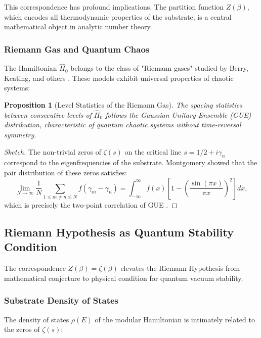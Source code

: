 \documentclass[11pt, a4paper]{article}
\theoremstyle{plain}
\newtheorem{proposition}[theorem]{Proposition}
\theoremstyle{definition}
\begin{document}
This correspondence has profound implications. The partition function $Z(\beta)$, which encodes all thermodynamic properties of the substrate, is a central mathematical object in analytic number theory.

\subsubsection{Riemann Gas and Quantum Chaos}

The Hamiltonian $\hat{H}_0$ belongs to the class of "Riemann gases" studied by Berry, Keating, and others \cite{Berry1999}. These models exhibit universal properties of chaotic systems:

\begin{proposition}[Level Statistics of the Riemann Gas]
The spacing statistics between consecutive levels of $\hat{H}_0$ follows the Gaussian Unitary Ensemble (GUE) distribution, characteristic of quantum chaotic systems without time-reversal symmetry.
\end{proposition}

\begin{proof}[Sketch]
The non-trivial zeros of $\zeta(s)$ on the critical line $s = 1/2 + i\gamma_n$ correspond to the eigenfrequencies of the substrate. Montgomery showed that the pair distribution of these zeros satisfies:
\begin{equation}
\lim_{N \to \infty} \frac{1}{N} \sum_{1 \leq m \neq n \leq N} f(\gamma_m - \gamma_n) = \int_{-\infty}^\infty f(x) \left[1 - \left(\frac{\sin(\pi x)}{\pi x}\right)^2\right] dx,
\end{equation}
which is precisely the two-point correlation of GUE \cite{Montgomery1973}.
\end{proof}

\subsection{Riemann Hypothesis as Quantum Stability Condition}

The correspondence $Z(\beta) = \zeta(\beta)$ elevates the Riemann Hypothesis from mathematical conjecture to physical condition for quantum vacuum stability.

\subsubsection{Substrate Density of States}

The density of states $\rho(E)$ of the modular Hamiltonian is intimately related to the zeros of $\zeta(s)$:
\end{document}
